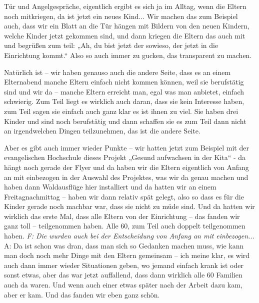 \begin{linenumbers*}
Tür und Angelgespräche, eigentlich ergibt es sich ja im Alltag, wenn die Eltern noch mitkriegen, da ist jetzt ein neues Kind... Wir machen das zum Beispiel auch, dass wir ein Blatt an die Tür hängen mit Bildern von den neuen Kindern, welche Kinder jetzt gekommen sind, und dann kriegen die Eltern das auch mit und begrüßen zum teil: „Ah, du bist jetzt der sowieso, der jetzt in die Einrichtung kommt.“ 
Also  so auch immer zu gucken, das transparent zu machen.   

Natürlich ist – wir haben genauso auch die andere Seite, dass es an einem Elternabend manche Eltern einfach nicht kommen können, weil sie berufstätig sind und wir da – manche Eltern erreicht man, egal was man anbietet, einfach schwierig.  Zum Teil liegt es wirklich auch daran, dass sie kein Interesse haben, zum Teil sagen sie einfach auch ganz klar es ist ihnen zu viel. Sie haben drei Kinder und sind noch berufstätig und dann schaffen sie es zum Teil dann nicht an irgendwelchen Dingen teilzunehmen, das ist die andere Seite.   

Aber es gibt auch immer wieder Punkte – wir hatten jetzt zum Beispiel mit der evangelischen Hochschule dieses Projekt „Gesund aufwachsen in der Kita“ - da hängt noch gerade der Flyer und da haben wir die Eltern eigentlich von Anfang an mit einbezogen in der Auswahl des Projektes, was wir da genau machen und haben dann Waldausflüge hier installiert und da hatten wir an einem Freitagnachmittag – haben wir dann relativ spät gelegt, also so dass es für die Kinder gerade noch machbar war, dass sie nicht zu müde sind. Und da hatten wir wirklich das erste Mal, dass alle Eltern von der Einrichtung – das fanden wir ganz toll – teilgenommen haben. Alle 60, zum Teil auch doppelt teilgenommen haben.
\emph{F: Die wurden auch bei der Entscheidung von Anfang an mit einbezogen...}\\
A: Da ist schon was dran, dass man sich so Gedanken machen muss, wie kann man doch noch mehr Dinge mit den Eltern gemeinsam – ich meine klar, es wird auch dann immer wieder Situationen geben, wo jemand einfach krank ist oder sonst etwas, aber das war jetzt auffallend, dass dann wirklich alle 60 Familien auch da waren. Und wenn auch einer etwas später nach der Arbeit dazu kam, aber er kam. Und das fanden wir eben ganz schön.


\end{linenumbers*}
